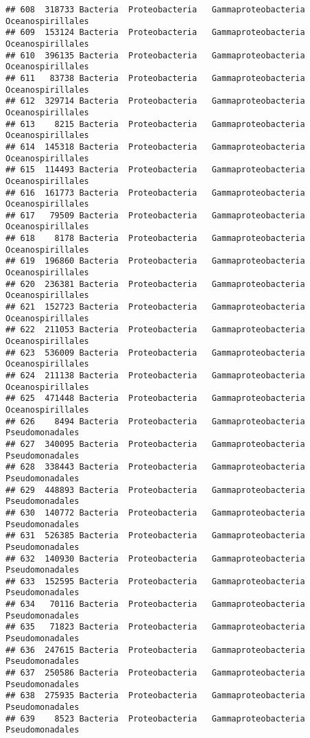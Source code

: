 \documentclass[
]{article}
\begin{document}
\begin{verbatim}
## 608  318733 Bacteria  Proteobacteria   Gammaproteobacteria   Oceanospirillales
## 609  153124 Bacteria  Proteobacteria   Gammaproteobacteria   Oceanospirillales
## 610  396135 Bacteria  Proteobacteria   Gammaproteobacteria   Oceanospirillales
## 611   83738 Bacteria  Proteobacteria   Gammaproteobacteria   Oceanospirillales
## 612  329714 Bacteria  Proteobacteria   Gammaproteobacteria   Oceanospirillales
## 613    8215 Bacteria  Proteobacteria   Gammaproteobacteria   Oceanospirillales
## 614  145318 Bacteria  Proteobacteria   Gammaproteobacteria   Oceanospirillales
## 615  114493 Bacteria  Proteobacteria   Gammaproteobacteria   Oceanospirillales
## 616  161773 Bacteria  Proteobacteria   Gammaproteobacteria   Oceanospirillales
## 617   79509 Bacteria  Proteobacteria   Gammaproteobacteria   Oceanospirillales
## 618    8178 Bacteria  Proteobacteria   Gammaproteobacteria   Oceanospirillales
## 619  196860 Bacteria  Proteobacteria   Gammaproteobacteria   Oceanospirillales
## 620  236381 Bacteria  Proteobacteria   Gammaproteobacteria   Oceanospirillales
## 621  152723 Bacteria  Proteobacteria   Gammaproteobacteria   Oceanospirillales
## 622  211053 Bacteria  Proteobacteria   Gammaproteobacteria   Oceanospirillales
## 623  536009 Bacteria  Proteobacteria   Gammaproteobacteria   Oceanospirillales
## 624  211138 Bacteria  Proteobacteria   Gammaproteobacteria   Oceanospirillales
## 625  471448 Bacteria  Proteobacteria   Gammaproteobacteria   Oceanospirillales
## 626    8494 Bacteria  Proteobacteria   Gammaproteobacteria     Pseudomonadales
## 627  340095 Bacteria  Proteobacteria   Gammaproteobacteria     Pseudomonadales
## 628  338443 Bacteria  Proteobacteria   Gammaproteobacteria     Pseudomonadales
## 629  448893 Bacteria  Proteobacteria   Gammaproteobacteria     Pseudomonadales
## 630  140772 Bacteria  Proteobacteria   Gammaproteobacteria     Pseudomonadales
## 631  526385 Bacteria  Proteobacteria   Gammaproteobacteria     Pseudomonadales
## 632  140930 Bacteria  Proteobacteria   Gammaproteobacteria     Pseudomonadales
## 633  152595 Bacteria  Proteobacteria   Gammaproteobacteria     Pseudomonadales
## 634   70116 Bacteria  Proteobacteria   Gammaproteobacteria     Pseudomonadales
## 635   71823 Bacteria  Proteobacteria   Gammaproteobacteria     Pseudomonadales
## 636  247615 Bacteria  Proteobacteria   Gammaproteobacteria     Pseudomonadales
## 637  250586 Bacteria  Proteobacteria   Gammaproteobacteria     Pseudomonadales
## 638  275935 Bacteria  Proteobacteria   Gammaproteobacteria     Pseudomonadales
## 639    8523 Bacteria  Proteobacteria   Gammaproteobacteria     Pseudomonadales

\end{verbatim}
\end{document}

